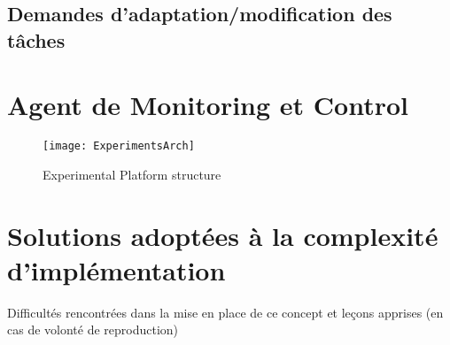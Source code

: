 \documentclass[french, a4paper, 11pt, twoside, pdftex]{StyleThese}
\begin{document}
        \subsection{Demandes d'adaptation/modification des tâches}
    \section{Agent de Monitoring et Control}
            \begin{figure}
                \centering
                \texttt{[image: ExperimentsArch]}
                \caption{Experimental Platform structure\label{fig:expe}}
            \end{figure}
    
    \section{Solutions adoptées à la complexité d'implémentation}
        Difficultés rencontrées dans la mise en place de ce concept et leçons apprises (en cas de volonté de reproduction)


\ifdefined{}
\else


\end{document}
